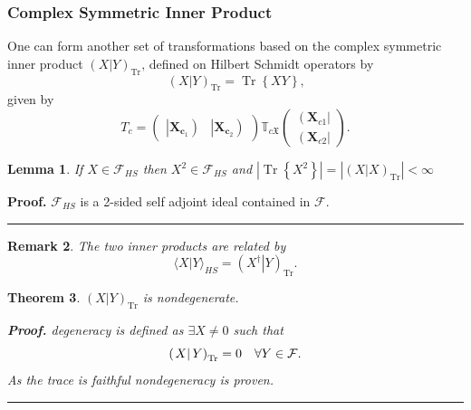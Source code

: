 \documentclass[aps, preprint]{revtex4}
\newtheorem{theorem}{Theorem}
\newtheorem{lemma}[theorem]{Lemma}
\newtheorem{remark}[theorem]{Remark}
\newenvironment{proof}[1][Proof]{\noindent\textbf{#1.} }{\ \rule{0.5em}{0.5em}}
\begin{document}
\subsubsection{Complex Symmetric Inner Product}
One can form another set of transformations based on the complex symmetric inner product $\left (\left .X\right \vert Y\right )_{\ensuremath{\operatorname*{Tr}}}\text{,}$ defined on Hilbert Schmidt operators by
\begin{equation}\left (\left .X\right \vert Y\right )_{\ensuremath{\operatorname*{Tr}}} =\ensuremath{\operatorname*{Tr}} \left \{X Y\right \}\text{,}
\end{equation}given by
\begin{equation}T_{c} =\left (\begin{array}{cc}\left \vert \mathbf{X}_{\mathbf{c}}_{1}\right ) & \left \vert \mathbf{X}_{\mathbf{c}}_{2}\right )\end{array}\right ) \mathbb{T}_{c \mathfrak{X}} \left (\begin{array}{c}\left (\mathbf{X}_{c 1}\right \vert  \\
\left (\mathbf{X}_{c 2}\right \vert \end{array}\right )\text{.}
\end{equation}


\begin{lemma}
If $X \in \mathcal{F}_{H S}$ then $X^{2} \in \mathcal{F}_{H S}$ and $\left \vert \ensuremath{\operatorname*{Tr}} \left \{X^{2}\right \}\right \vert  =\left \vert \left (\left .X\right \vert X\right )_{\ensuremath{\operatorname*{Tr}}}\right \vert  <\infty $ 
\end{lemma}


\begin{proof}
$\mathcal{F}_{H S}$ is a 2-sided self adjoint ideal contained in $\mathcal{F}\text{.}$ 
\end{proof}


\begin{remark}
The two inner products are related by
\begin{equation} \langle \left .X\right \vert Y \rangle _{H S} =\left (\left .X^{ \dag }\right \vert Y\right )_{\ensuremath{\operatorname*{Tr}}}\text{.}
\end{equation}
\end{remark}


\begin{theorem}
$\left (\left .X\right \vert Y\right )_{\ensuremath{\operatorname*{Tr}}}$ is nondegenerate. 


\begin{proof}
degeneracy is defined as $ \exists X \neq 0$ such that
\begin{equation}\left (\left .X\right \vert Y\right )_{\ensuremath{\operatorname*{Tr}}} =0\text{\quad } \forall Y \in \mathcal{F}\text{.}
\end{equation}As the trace is faithful nondegeneracy is proven. 
\end{proof}


\end{theorem}
\end{document}
